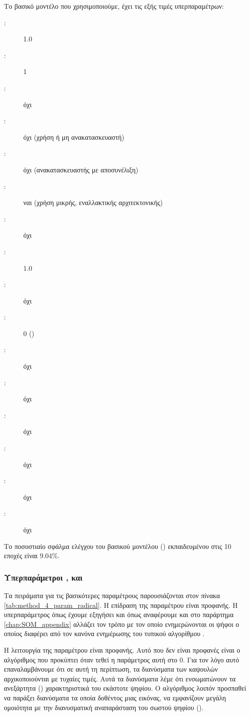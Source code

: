 Το βασικό μοντέλο που χρησιμοποιούμε, έχει τις εξής τιμές υπερπαραμέτρων:
\begin{description}
    \item[:] 1.0
    \item[:] 1
    \item[:] όχι
    \item[:] όχι (χρήση ή μη ανακατασκευαστή)
    \item[:] όχι (ανακατασκευαστής με αποσυνέλιξη)
    \item[:] ναι (χρήση μικρής, εναλλακτικής αρχιτεκτονικής)
    \item[:] όχι
    \item[:] 1.0
    \item[:] όχι
    \item[:] 0 ()
    \item[:] όχι
    \item[:] όχι
    \item[:] όχι
    \item[:] όχι
    \item[:] όχι
    \item[:] όχι        
\end{description}

Το ποσοστιαίο σφάλμα ελέγχου του βασικού μοντέλου () εκπαιδευμένου στις 10 εποχές είναι $9.04\%$.

\subsubsection{Υπερπαράμετροι ,  και }
Τα πειράματα για τις βασικότερες παραμέτρους παρουσιάζονται στον πίνακα \ref{tab:method_4_param_radical}. Η επίδραση της παραμέτρου  είναι προφανής. Η υπερπαράμετρος  όπως έχουμε εξηγήσει και όπως αναφέρουμε και στο παράρτημα \ref{chap:SOM_appendix} αλλάζει τον τρόπο με τον οποίο ενημερώνονται οι ψήφοι ο οποίος διαφέρει από τον κανόνα ενημέρωσης του τυπικού αλγορίθμου .\par

Η λειτουργία της παραμέτρου  είναι προφανής. Αυτό που δεν είναι προφανές είναι ο αλγόριθμος που προκύπτει όταν τεθεί η παράμετρος αυτή στο 0. Για τον λόγο αυτό επαναλαμβάνουμε ότι σε αυτή τη περίπτωση, τα διανύσματα των καψουλών αρχικοποιούνται με τυχαίες τιμές. Αυτά τα διανύσματα λέμε ότι ενσωματώνουν τα ανεξάρτητα () χαρακτηριστικά του εκάστοτε ψηφίου. Ο αλγόριθμος λοιπόν προσπαθεί να παράξει διανύσματα τα οποία δοθέντος μιας εικόνας, να εμφανίζουν μεγάλη ομοιότητα με την διανυσματική αναπαράσταση του σωστού ψηφίου ().\par

